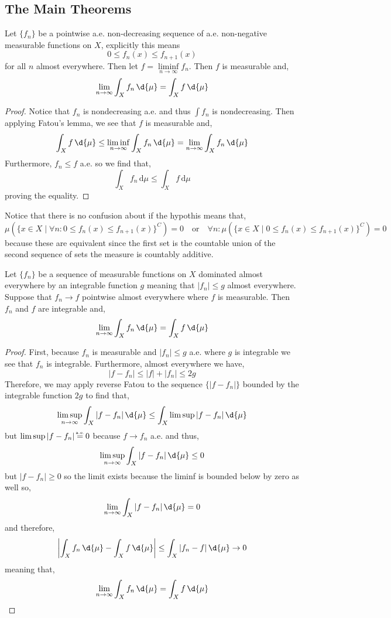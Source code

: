 \documentclass[12pt]{article}
\newcommand\eqae{\mathrel{\stackrel{\makebox[0pt]{\mbox{\normalfont\tiny a.e.}}}{=}}}
\begin{document}
\subsection{The Main Theorems}

\begin{thm}
Let $\{ f_n \}$ be a pointwise a.e. non-decreasing sequence of a.e. non-negative measurable functions on $X$, explicitly this means
\[ 0 \le f_n(x) \le f_{n+1}(x)  \]
for all $n$ almost everywhere. Then let $f = \liminf\limits_{n \to \infty} f_n$. Then $f$ is measurable and,
\[ \lim_{n \to \infty} \int_X f_n \, \d{\mu} = \int_X f \, \d{\mu} \]
\end{thm}

\begin{proof}
Notice that $f_n$ is nondecreasing a.e. and thus $\int f_n$ is nondecreasing. Then applying Fatou's lemma, we see that $f$ is measurable and,
\[ \int_X f \, \d{\mu} \le \liminf_{n \to \infty} \int_X f_n \, \d{\mu} = \lim_{n \to \infty} \int_X f_n \, \d{\mu} \]
Furthermore, $f_n \le f$ a.e. so we find that,
\[ \int_X f_n \, \mathrm{d}\mu \le \int_X f \, \mathrm{d} \mu \]
proving the equality.
\end{proof}

\begin{rmk}
Notice that there is no confusion about if the hypothis means that,
\[ \mu(\{ x \in X \mid \forall n : 0 \le f_n(x) \le f_{n+1}(x) \}^C) = 0 \quad \text{or} \quad \forall n : \mu(\{ x \in X \mid 0 \le f_n(x) \le f_{n+1}(x) \}^C) = 0 \]
because these are equivalent since the first set is the countable union of the second sequence of sets the measure is countably additive.
\end{rmk}

\begin{thm}
Let $\{ f_n \}$ be a sequence of measurable functions on $X$ dominated almost everywhere by an integrable function $g$ meaning that $|f_n| \le g$ almost everywhere. Suppose that $f_n \to f$ pointwise almost everywhere where $f$ is measurable. Then $f_n$ and $f$ are integrable and,
\[ \lim_{n \to \infty} \int_X f_n \, \d{\mu} = \int_X f \, \d{\mu} \]
\end{thm}

\begin{proof}
First, because $f_n$ is measurable and $|f_n| \le g$ a.e. where $g$ is integrable we see that $f_n$ is integrable. Furthermore, almost everywhere we have,
\[ |f - f_n| \le |f| + |f_n| \le 2 g \]
Therefore, we may apply reverse Fatou to the sequence $\{ |f - f_n| \}$ bounded by the integrable function $2 g$ to find that,
\[ \limsup_{n \to \infty} \int_X |f - f_n| \, \d{\mu} \le \int_X \limsup |f - f_n| \, \d{\mu}  \]
but $\limsup |f - f_n| \eqae 0$ because $f \to f_n$ a.e. and thus,
\[ \limsup_{n \to \infty} \int_X |f - f_n| \, \d{\mu} \le 0 \]
but $|f - f_n| \ge 0$ so the limit exists because the liminf is bounded below by zero as well so,
\[ \lim_{n \to \infty}  \int_X |f - f_n| \, \d{\mu} = 0 \]
and therefore,
\[ \left| \int_X f_n \, \d{\mu} - \int_X f \, \d{\mu} \right| \le \int_X |f_n - f| \, \d{\mu} \to 0 \]
meaning that,
\[ \lim_{n \to \infty} \int_X f_n \, \d{\mu} = \int_X f \, \d{\mu} \]
\end{proof}
\end{document}
